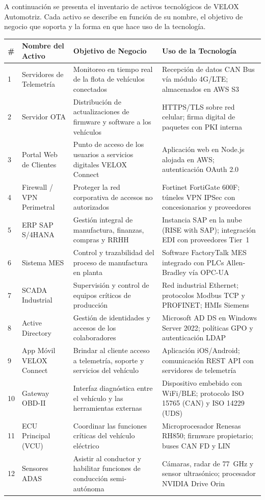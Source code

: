 \documentclass[letterpaper,11pt]{article}
\begin{document}
A continuación se presenta el inventario de activos tecnológicos de VELOX Automotriz. Cada activo se describe en función de su nombre, el objetivo de negocio que soporta y la forma en que hace uso de la tecnología.

\vspace{0.3cm}
\begingroup
\small
{}
\begin{tabular}{|p{0.4cm}|p{3.0cm}|p{5.0cm}|p{5.0cm}|}
\hline
\rowcolor{blue!25}
\textbf{\#} & \textbf{Nombre del Activo} & \textbf{Objetivo de Negocio} & \textbf{Uso de la Tecnología} \\
\hline
1 & Servidores de Telemetría & Monitoreo en tiempo real de la flota de vehículos conectados & Recepción de datos CAN Bus vía módulo 4G/LTE; almacenados en AWS S3 \\
\hline
2 & Servidor OTA & Distribución de actualizaciones de firmware y software a los vehículos & HTTPS/TLS sobre red celular; firma digital de paquetes con PKI interna \\
\hline
3 & Portal Web de Clientes & Punto de acceso de los usuarios a servicios digitales VELOX Connect & Aplicación web en Node.js alojada en AWS; autenticación OAuth 2.0 \\
\hline
4 & Firewall / VPN Perimetral & Proteger la red corporativa de accesos no autorizados & Fortinet FortiGate 600F; túneles VPN IPSec con concesionarios y proveedores \\
\hline
5 & ERP SAP S/4HANA & Gestión integral de manufactura, finanzas, compras y RRHH & Instancia SAP en la nube (RISE with SAP); integración EDI con proveedores Tier~1 \\
\hline
6 & Sistema MES & Control y trazabilidad del proceso de manufactura en planta & Software FactoryTalk MES integrado con PLCs Allen-Bradley vía OPC-UA \\
\hline
7 & SCADA Industrial & Supervisión y control de equipos críticos de producción & Red industrial Ethernet; protocolos Modbus TCP y PROFINET; HMIs Siemens \\
\hline
8 & Active Directory & Gestión de identidades y accesos de los colaboradores & Microsoft AD DS en Windows Server 2022; políticas GPO y autenticación LDAP \\
\hline
9 & App Móvil VELOX Connect & Brindar al cliente acceso a telemetría, soporte y servicios del vehículo & Aplicación iOS/Android; comunicación REST API con servidores de telemetría \\
\hline
10 & Gateway OBD-II & Interfaz diagnóstica entre el vehículo y las herramientas externas & Dispositivo embebido con WiFi/BLE; protocolo ISO 15765 (CAN) y ISO 14229 (UDS) \\
\hline
11 & ECU Principal (VCU) & Coordinar las funciones críticas del vehículo eléctrico & Microprocesador Renesas RH850; firmware propietario; buses CAN FD y LIN \\
\hline
12 & Sensores ADAS & Asistir al conductor y habilitar funciones de conducción semi-autónoma & Cámaras, radar de 77~GHz y sensor ultrasónico; procesador NVIDIA Drive Orin \\
\hline
\end{tabular}
\endgroup
\end{document}
